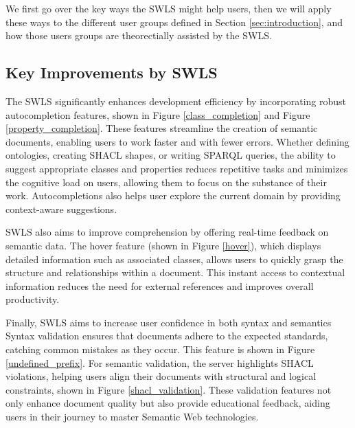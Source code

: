 We first go over the key ways the SWLS might help users, then we will apply these ways to the different user groups defined in Section \ref{sec:introduction}, 
and how those users groups are theorectially assisted by the SWLS.

\subsection{Key Improvements by SWLS}

The SWLS significantly enhances development efficiency by incorporating robust autocompletion features, shown in Figure \ref{class_completion} and Figure \ref{property_completion}.
These features streamline the creation of semantic documents, enabling users to work faster and with fewer errors. 
Whether defining ontologies, creating SHACL shapes, or writing SPARQL queries, the ability to suggest appropriate classes and properties reduces repetitive tasks and minimizes the cognitive load on users, allowing them to focus on the substance of their work.
Autocompletions also helps user explore the current domain by providing context-aware suggestions.

SWLS also aims to improve comprehension by offering real-time feedback on semantic data.
The hover feature (shown in Figure \ref{hover}), which displays detailed information such as associated classes, allows users to quickly grasp the structure and relationships within a document. 
This instant access to contextual information reduces the need for external references and improves overall productivity.

Finally, SWLS aims to increase user confidence in both syntax and semantics
Syntax validation ensures that documents adhere to the expected standards, catching common mistakes as they occur. This feature is shown in Figure \ref{undefined_prefix}.
For semantic validation, the server highlights SHACL violations, helping users align their documents with structural and logical constraints, shown in Figure \ref{shacl_validation}. 
These validation features not only enhance document quality but also provide educational feedback, aiding users in their journey to master Semantic Web technologies.


